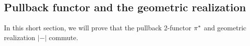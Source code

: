 \documentclass[a4paper,10pt
,draft
]{article}%
\renewcommand{\1}{\eta}%
\begin{document}
% 



\subsection{Pullback functor and the geometric realization}

In this short section, we will prove that the pullback 2-functor $\pi^{\**}$ and geometric realization $|-|$ commute.
\end{document}
